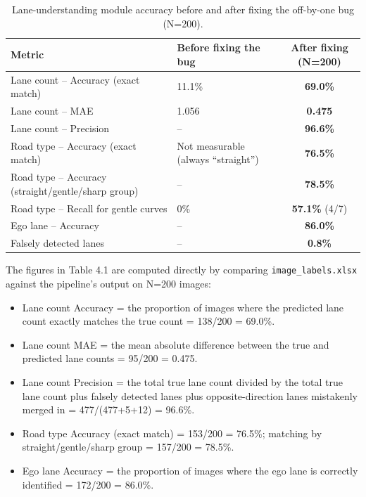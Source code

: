 \documentclass[12pt,a4paper]{report}
\begin{document}
\begin{table}[htbp]
    \centering
    \small
    \caption{Lane-understanding module accuracy before and after fixing the off-by-one bug (N=200).}
    \label{tab:4.1}
    \begin{tabular}{@{}p{5.2cm}p{3.6cm}c@{}}
        \toprule
        \textbf{Metric} & \textbf{Before fixing the bug} & \textbf{After fixing (N=200)} \\
        \midrule
        Lane count -- Accuracy (exact match)                 & 11.1\%                                & \textbf{69.0\%} \\
        Lane count -- MAE                                    & 1.056                                 & \textbf{0.475} \\
        Lane count -- Precision                              & --                                     & \textbf{96.6\%} \\
        Road type -- Accuracy (exact match)                  & Not measurable (always ``straight'')  & \textbf{76.5\%} \\
        Road type -- Accuracy (straight/gentle/sharp group)  & --                                     & \textbf{78.5\%} \\
        Road type -- Recall for gentle curves                & 0\%                                    & \textbf{57.1\%} (4/7) \\
        Ego lane -- Accuracy                                 & --                                     & \textbf{86.0\%} \\
        Falsely detected lanes                               & --                                     & \textbf{0.8\%} \\
        \bottomrule
    \end{tabular}
\end{table}

The figures in Table 4.1 are computed directly by comparing \texttt{image\_labels.xlsx} against the pipeline's output on N=200 images:

\begin{itemize}
    \item Lane count Accuracy = the proportion of images where the predicted lane count exactly matches the true count = 138/200 = 69.0\%.
    \item Lane count MAE = the mean absolute difference between the true and predicted lane counts = 95/200 = 0.475.
    \item Lane count Precision = the total true lane count divided by the total true lane count plus falsely detected lanes plus opposite-direction lanes mistakenly merged in = 477/(477+5+12) = 96.6\%.
    \item Road type Accuracy (exact match) = 153/200 = 76.5\%; matching by straight/gentle/sharp group = 157/200 = 78.5\%.
    \item Ego lane Accuracy = the proportion of images where the ego lane is correctly identified = 172/200 = 86.0\%.
\end{itemize}
\end{document}
